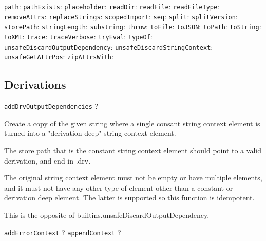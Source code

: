 \documentclass[9pt, a4paper, landscape]{extarticle}
\newcommand{\cmd}[1]{\texttt{#1}}
\begin{document}
\begin{multicols*}{3}
\cmd{path}:
\cmd{pathExists}:
\cmd{placeholder}:
\cmd{readDir}:
\cmd{readFile}:
\cmd{readFileType}:
\cmd{removeAttrs}:
\cmd{replaceStrings}:
\cmd{scopedImport}:
\cmd{seq}:
\cmd{split}:
\cmd{splitVersion}:
\cmd{storePath}:
\cmd{stringLength}:
\cmd{substring}:
\cmd{throw}:
\cmd{toFile}:
\cmd{toJSON}:
\cmd{toPath}:
\cmd{toString}:
\cmd{toXML}:
\cmd{trace}:
\cmd{traceVerbose}:
\cmd{tryEval}:
\cmd{typeOf}:
\cmd{unsafeDiscardOutputDependency}:
\cmd{unsafeDiscardStringContext}:
\cmd{unsafeGetAttrPos}:
\cmd{zipAttrsWith}:

\subsection*{Derivations}

  \cmd{addDrvOutputDependencies} ?

    Create a copy of the given string where a single consant string context element is turned into a "derivation deep" string context element.

    The store path that is the constant string context element should point to a valid derivation, and end in .drv.

    The original string context element must not be empty or have multiple elements, and it must not have any other type of element other than a constant or derivation deep element. The latter is supported so this function is idempotent.

    This is the opposite of builtins.unsafeDiscardOutputDependency.
  
\cmd{addErrorContext} ?
\cmd{appendContext} ?


\end{multicols*}
\end{document}
